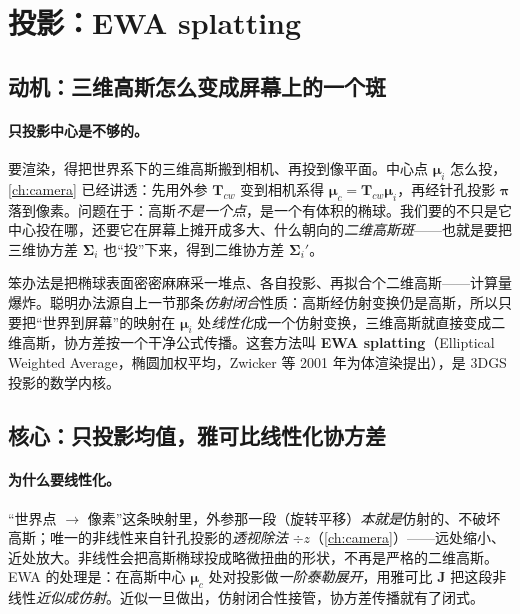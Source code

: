 \section{投影：EWA splatting}
\label{sec:3dgs-proj}

\subsection{动机：三维高斯怎么变成屏幕上的一个斑}

\paragraph{只投影中心是不够的。}
要渲染，得把世界系下的三维高斯搬到相机、再投到像平面。中心点 $\boldsymbol\mu_i$ 怎么投，\cref{ch:camera} 已经讲透：先用外参 $\mathbf T_{cw}$ 变到相机系得 $\boldsymbol\mu_c=\mathbf T_{cw}\boldsymbol\mu_i$，再经针孔投影 $\boldsymbol\pi$ 落到像素。问题在于：高斯\emph{不是一个点}，是一个有体积的椭球。我们要的不只是它中心投在哪，还要它在屏幕上摊开成多大、什么朝向的\emph{二维高斯斑}——也就是要把三维协方差 $\boldsymbol\Sigma_i$ 也“投”下来，得到二维协方差 $\boldsymbol\Sigma_i'$。

笨办法是把椭球表面密密麻麻采一堆点、各自投影、再拟合个二维高斯——计算量爆炸。聪明办法源自上一节那条\emph{仿射闭合}性质：高斯经仿射变换仍是高斯，所以只要把“世界到屏幕”的映射在 $\boldsymbol\mu_i$ 处\emph{线性化}成一个仿射变换，三维高斯就直接变成二维高斯，协方差按一个干净公式传播。这套方法叫 \textbf{EWA splatting}（Elliptical Weighted Average，椭圆加权平均，Zwicker 等 2001 年为体渲染提出），是 3DGS 投影的数学内核。

\subsection{核心：只投影均值，雅可比线性化协方差}

\paragraph{为什么要线性化。}
“世界点 $\to$ 像素”这条映射里，外参那一段（旋转平移）\emph{本就是}仿射的、不破坏高斯；唯一的非线性来自针孔投影的\emph{透视除法} $\div z$（\cref{ch:camera}）——远处缩小、近处放大。非线性会把高斯椭球投成略微扭曲的形状，不再是严格的二维高斯。EWA 的处理是：在高斯中心 $\boldsymbol\mu_c$ 处对投影做\emph{一阶泰勒展开}，用雅可比 $\mathbf J$ 把这段非线性\emph{近似成仿射}。近似一旦做出，仿射闭合性接管，协方差传播就有了闭式。


